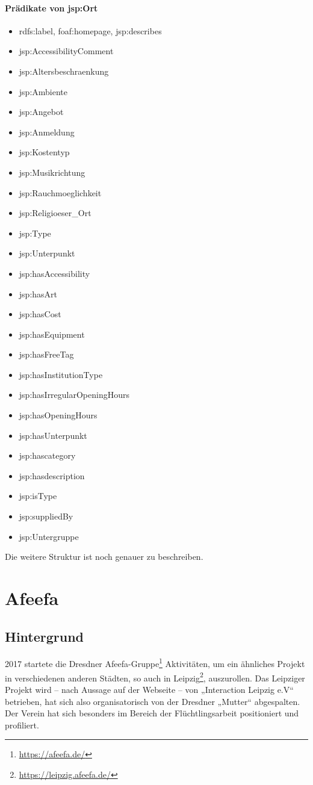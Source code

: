 \documentclass[a4paper,11pt]{article}
\begin{document}
\paragraph{Prädikate von jsp:Ort}
\begin{itemize}
\item rdfs:label, foaf:homepage, jsp:describes
\item jsp:AccessibilityComment
\item jsp:Altersbeschraenkung
\item jsp:Ambiente
\item jsp:Angebot
\item jsp:Anmeldung
\item jsp:Kostentyp
\item jsp:Musikrichtung
\item jsp:Rauchmoeglichkeit
\item jsp:Religioeser\_Ort
\item jsp:Type
\item jsp:Unterpunkt
\item jsp:hasAccessibility
\item jsp:hasArt
\item jsp:hasCost
\item jsp:hasEquipment
\item jsp:hasFreeTag
\item jsp:hasInstitutionType
\item jsp:hasIrregularOpeningHours
\item jsp:hasOpeningHours
\item jsp:hasUnterpunkt
\item jsp:hascategory
\item jsp:hasdescription
\item jsp:isType
\item jsp:suppliedBy
\item jsp:Untergruppe
\end{itemize}

Die weitere Struktur ist noch genauer zu beschreiben. 
\newpage

\section{Afeefa}

\subsection{Hintergrund}
2017 startete die Dresdner Afeefa-Gruppe\footnote{\url{https://afeefa.de/}}
Aktivitäten, um ein ähnliches Projekt in verschiedenen anderen Städten, so auch
in Leipzig\footnote{\url{https://leipzig.afeefa.de/}}, auszurollen.  Das
Leipziger Projekt wird -- nach Aussage auf der Webseite -- von „Interaction
Leipzig e.V“ betrieben, hat sich also organisatorisch von der Dresdner „Mutter“
abgespalten. Der Verein hat sich besonders im Bereich der Flüchtlingsarbeit
positioniert und profiliert. 
\end{document}
